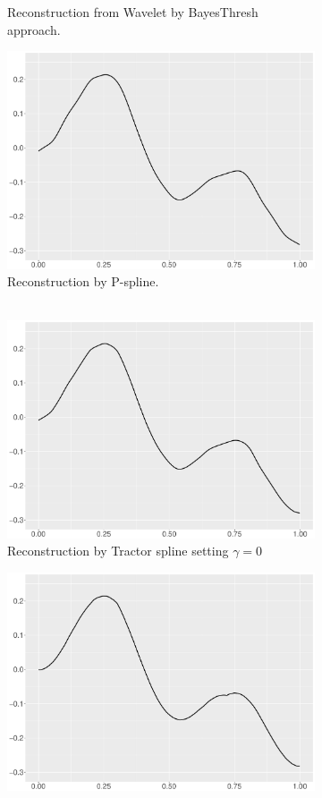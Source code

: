 \begin{figure}
\begin{subfigure}{0.45\textwidth}
    \caption{Reconstruction from Wavelet by BayesThresh approach.}
    \end{subfigure}
    \begin{subfigure}{0.45\textwidth}
    \centering
    \includegraphics[width=\linewidth,height=0.45\textwidth]{Chapters/02TractorSplineTheory/plot/ggplot/ggHeaviSinePSpline.pdf}
    \caption{Reconstruction by P-spline. \\\mbox{  } }
    \end{subfigure}
    \begin{subfigure}{0.45\textwidth}
    \centering
    \includegraphics[width=\linewidth,height=0.45\textwidth]{Chapters/02TractorSplineTheory/plot/ggplot/ggHeaviSineGamma.pdf}
    \caption{Reconstruction by Tractor spline setting $\gamma=0$}
    \end{subfigure}
  \begin{subfigure}{0.45\textwidth}
    \centering
    \includegraphics[width=\linewidth,height=0.45\textwidth]{Chapters/02TractorSplineTheory/plot/ggplot/ggHeaviSineTractorAPT.pdf}

\end{subfigure}
\end{figure}
